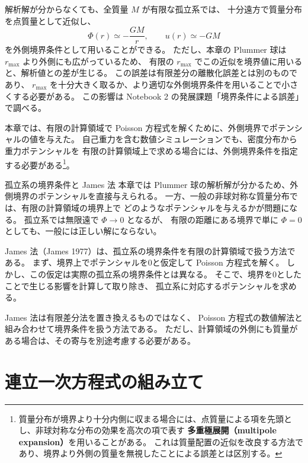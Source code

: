 解析解が分からなくても、全質量 $M$ が有限な孤立系では、
十分遠方で質量分布を点質量として近似し、
\begin{equation}
 \Phi(r)\simeq-\frac{GM}{r},
 \qquad
 u(r)\simeq-GM
\label{eq:ch2-outer-pointmass}
\end{equation}
を外側境界条件として用いることができる。
ただし、本章の Plummer 球は $r_{\max}$ より外側にも広がっているため、
有限の $r_{\max}$ でこの近似を境界値に用いると、解析値との差が生じる。
この誤差は有限差分の離散化誤差とは別のものであり、
$r_{\max}$ を十分大きく取るか、より適切な外側境界条件を用いることで小さくする必要がある。
この影響は Notebook 2 の発展課題「境界条件による誤差」で調べる。

本章では、有限の計算領域で Poisson 方程式を解くために、外側境界でポテンシャルの値を与えた。
自己重力を含む数値シミュレーションでも、密度分布から重力ポテンシャルを
有限の計算領域上で求める場合には、外側境界条件を指定する必要がある\footnote{
質量分布が境界より十分内側に収まる場合には、点質量による項を先頭とし、非球対称な分布の効果を高次の項で表す
\textbf{多重極展開（multipole expansion）}を用いることがある\cite{tomisaka2007}。
これは質量配置の近似を改良する方法であり、境界より外側の質量を無視したことによる誤差とは区別する。
}。


\begin{topicblock}{孤立系の境界条件と James 法}
本章では Plummer 球の解析解が分かるため、外側境界のポテンシャルを直接与えられる。
一方、一般の非球対称な質量分布では、有限の計算領域の境界上で
どのようなポテンシャルを与えるかが問題になる。
孤立系では無限遠で $\Phi\to0$ となるが、
有限の距離にある境界で単に $\Phi=0$ としても、一般には正しい解にならない。

James 法（James 1977）は、孤立系の境界条件を有限の計算領域で扱う方法である\cite{james1977,bt2008}。
まず、境界上でポテンシャルを0と仮定して Poisson 方程式を解く。
しかし、この仮定は実際の孤立系の境界条件とは異なる。
そこで、境界を0としたことで生じる影響を計算して取り除き、
孤立系に対応するポテンシャルを求める。

James 法は有限差分法を置き換えるものではなく、
Poisson 方程式の数値解法と組み合わせて境界条件を扱う方法である。
ただし、計算領域の外側にも質量がある場合は、その寄与を別途考慮する必要がある。
\end{topicblock}

\section{連立一次方程式の組み立て}
\label{sec:ch2-matrix}

